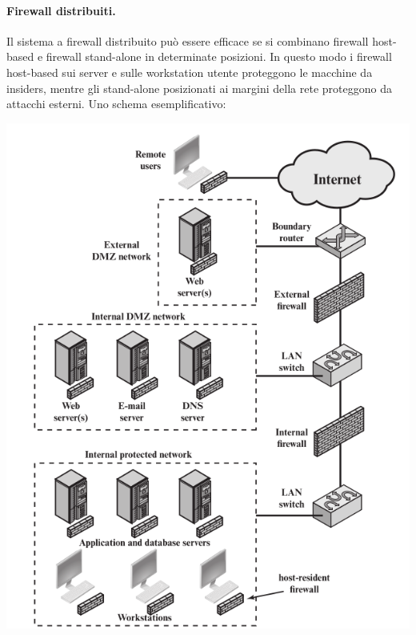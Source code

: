 \documentclass[a4paper, 10pt, twoside]{article}
\begin{document}
	\newpage
	\paragraph{Firewall distribuiti.} Il sistema a firewall distribuito può essere efficace se si combinano firewall host-based e firewall stand-alone in determinate posizioni. In questo modo i firewall host-based sui server e sulle workstation utente proteggono le macchine da insiders, mentre gli stand-alone posizionati ai margini della rete proteggono da attacchi esterni.
	Uno schema esemplificativo:
	\begin{center}
		\includegraphics[scale=0.4]{img/distfirewall.png}
	\end{center}
\end{document}
